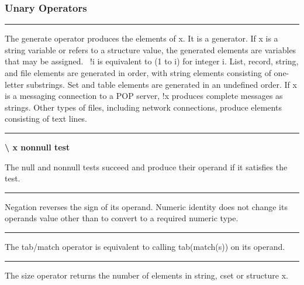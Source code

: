 \subsubsection{Unary Operators}

\bigskip\hrule\vspace{0.1cm}

\noindent
{}The generate
operator produces the elements of \textsf{x}. It is a generator. If
\textsf{x} is a string variable or refers to a structure value, the
generated elements are variables that may be assigned. \ \textsf{!i} is
equivalent to \textsf{(1 to i)} for integer \textsf{i}. List, record,
string, and file elements are generated in order, with string elements
consisting of one-letter substrings. Set and table elements are
generated in an undefined order. If \textsf{x} is a messaging
connection to a POP server, \textsf{!x} produces complete messages as
strings. Other types of files, including network connections, produce
elements consisting of text lines.

\bigskip\hrule\vspace{0.1cm}

\noindent
{\bf {\textbackslash} x \hfill nonnull test}

\noindent
The null and nonnull tests succeed
and produce their operand if it satisfies the test.

\bigskip\hrule\vspace{0.1cm}


\noindent
Negation reverses the sign of its operand. Numeric identity does not
change its operand{\textquotesingle}s value other than to convert to a
required numeric type.

\bigskip\hrule\vspace{0.1cm}

\noindent
{}The tab/match operator is equivalent to calling
\textsf{tab(match(s))} on its operand.

\bigskip\hrule\vspace{0.1cm}

\noindent
The size operator returns the number of elements in
string, cset or structure \textsf{x}.

